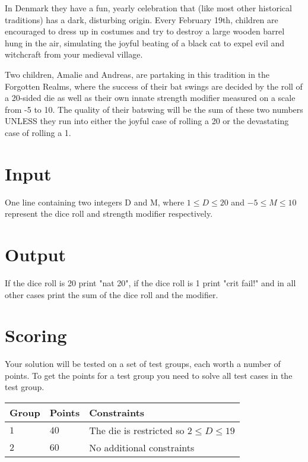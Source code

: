 

In Denmark they have a fun, yearly celebration that (like most other historical traditions) has a dark, disturbing origin. Every February 19th, children are encouraged to dress up in costumes and try to destroy a large wooden barrel hung in the air, simulating the joyful beating of a black cat to expel evil and witchcraft from your medieval village.

Two children, Amalie and Andreas, are partaking in this tradition in the Forgotten Realms, where the success of their bat swings are decided by the roll of a 20-sided die as well as their own innate strength modifier measured on a scale from -5 to 10. The quality of their batswing will be the sum of these two numbers UNLESS they run into either the joyful case of rolling a 20 or the devastating case of rolling a 1.

\section*{Input}
One line containing two integers D and M, where $1\le D \le 20$ and $-5\le M \le 10$ represent the dice roll and strength modifier respectively.

\section*{Output}
If the dice roll is 20 print "nat 20", if the dice roll is 1 print "crit fail!" and in all other cases print the sum of the dice roll and the modifier.

\section*{Scoring}
Your solution will be tested on a set of test groups, each worth a number of points.
To get the points for a test group you need to solve all test cases in the test group.

\noindent
\begin{tabular}{| l | l | l |}
  \hline
  Group & Points & Constraints \\ \hline
  $1$    & $40$         & The die is restricted so $2\le D \le 19 $ \\ \hline
  $2$    & $60$        &  No additional constraints \\ \hline
\end{tabular}
